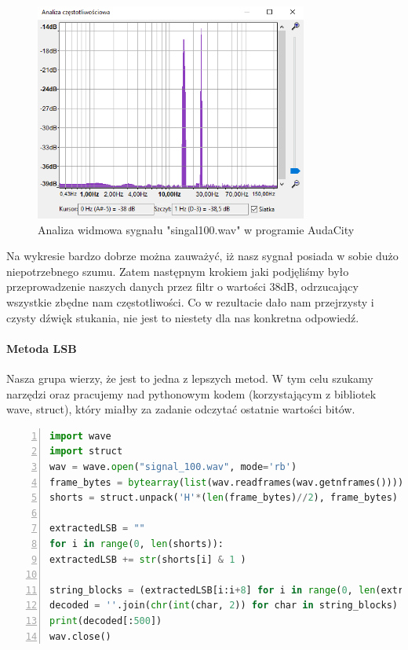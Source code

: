 \documentclass[a4paper,titleauthor]{mwart}
\begin{document}
\begin{figure}[h]
	\centering
	\includegraphics[width=0.8\textwidth]{widmo_audacity.PNG}
	\caption{Analiza widmowa sygnału "singal100.wav" w programie AudaCity}
\end{figure}

Na wykresie bardzo dobrze można zauważyć, iż nasz sygnał posiada w sobie dużo niepotrzebnego szumu. Zatem następnym krokiem jaki podjęliśmy było przeprowadzenie naszych danych przez filtr o wartości 38dB, odrzucający wszystkie zbędne nam częstotliwości. Co w rezultacie dało nam przejrzysty i czysty dźwięk stukania, nie jest to niestety dla nas konkretna odpowiedź. 

\paragraph{Metoda LSB} Nasza grupa wierzy, że jest to jedna z lepszych metod. W tym celu szukamy narzędzi oraz pracujemy nad pythonowym kodem (korzystającym z bibliotek wave, struct), który miałby za zadanie odczytać ostatnie wartości bitów.

\begin{lstlisting}[label=lst:wydruk,caption={Nasz dotychczasowy kod},language=Python,numbers=left]
import wave
import struct
wav = wave.open("signal_100.wav", mode='rb')
frame_bytes = bytearray(list(wav.readframes(wav.getnframes())))
shorts = struct.unpack('H'*(len(frame_bytes)//2), frame_bytes)

extractedLSB = ""
for i in range(0, len(shorts)):
extractedLSB += str(shorts[i] & 1 )

string_blocks = (extractedLSB[i:i+8] for i in range(0, len(extractedLSB), 8))
decoded = ''.join(chr(int(char, 2)) for char in string_blocks)
print(decoded[:500])
wav.close()
\end{lstlisting}
\end{document}
